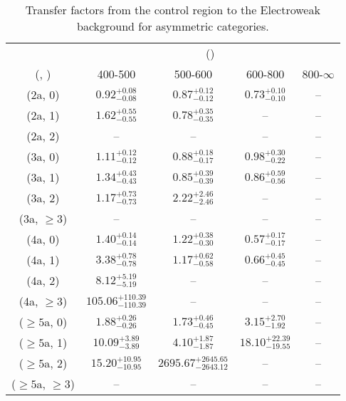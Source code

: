 \begin{table}[h!]
\tiny
\centering
\caption{Transfer factors from the \gj control region to the Electroweak background for asymmetric categories.\label{tab:tf_gj_total_asym}}
\begin{tabular}
{ccccc}
	\hline\hline
	& \multicolumn{4}{c}{\scalht (\gev)} \\ 
	 (\njet,  \nb) & 400-500 & 500-600 & 600-800 & 800-$\infty$ \\ [0.8ex] 
\hline
	(2a, 0) & $0.92^{+ 0.08 }_{- 0.08 }$ & $0.87^{+ 0.12 }_{- 0.12 }$ & $0.73^{+ 0.10 }_{- 0.10 }$ & -- \\[0.5ex] 
	(2a, 1) & $1.62^{+ 0.55 }_{- 0.55 }$ & $0.78^{+ 0.35 }_{- 0.35 }$ & -- & -- \\[0.5ex] 
	(2a, 2) & -- & -- & -- & -- \\[0.5ex] 
	(3a, 0) & $1.11^{+ 0.12 }_{- 0.12 }$ & $0.88^{+ 0.18 }_{- 0.17 }$ & $0.98^{+ 0.30 }_{- 0.22 }$ & -- \\[0.5ex] 
	(3a, 1) & $1.34^{+ 0.43 }_{- 0.43 }$ & $0.85^{+ 0.39 }_{- 0.39 }$ & $0.86^{+ 0.59 }_{- 0.56 }$ & -- \\[0.5ex] 
	(3a, 2) & $1.17^{+ 0.73 }_{- 0.73 }$ & $2.22^{+ 2.46 }_{- 2.46 }$ & -- & -- \\[0.5ex] 
	(3a, $\ge3$) & -- & -- & -- & -- \\[0.5ex] 
	(4a, 0) & $1.40^{+ 0.14 }_{- 0.14 }$ & $1.22^{+ 0.38 }_{- 0.30 }$ & $0.57^{+ 0.17 }_{- 0.17 }$ & -- \\[0.5ex] 
	(4a, 1) & $3.38^{+ 0.78 }_{- 0.78 }$ & $1.17^{+ 0.62 }_{- 0.58 }$ & $0.66^{+ 0.45 }_{- 0.45 }$ & -- \\[0.5ex] 
	(4a, 2) & $8.12^{+ 5.19 }_{- 5.19 }$ & -- & -- & -- \\[0.5ex] 
	(4a, $\ge3$) & $105.06^{+ 110.39 }_{- 110.39 }$ & -- & -- & -- \\[0.5ex] 
	($\ge5$a, 0) & $1.88^{+ 0.26 }_{- 0.26 }$ & $1.73^{+ 0.46 }_{- 0.45 }$ & $3.15^{+ 2.70 }_{- 1.92 }$ & -- \\[0.5ex] 
	($\ge5$a, 1) & $10.09^{+ 3.89 }_{- 3.89 }$ & $4.10^{+ 1.87 }_{- 1.87 }$ & $18.10^{+ 22.39 }_{- 19.55 }$ & -- \\[0.5ex] 
	($\ge5$a, 2) & $15.20^{+ 10.95 }_{- 10.95 }$ & $2695.67^{+ 2645.65 }_{- 2643.12 }$ & -- & -- \\[0.5ex] 
	($\ge5$a, $\ge3$) & -- & -- & -- & -- \\[0.5ex] 
	\hline
	\hline
\end{tabular}
\end{table}
